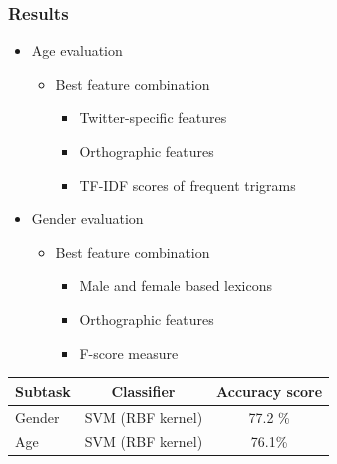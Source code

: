 \documentclass[slidestop,compress,11pt,xcolor=dvipsnames]{beamer}
\begin{document}
\begin{frame}[fragile] %
\frametitle{Results}
\begin{itemize}
	\item Age evaluation
	\begin{itemize}
		\item Best feature combination
		\begin{itemize}
			\item Twitter-specific features 
			\item Orthographic features
			\item TF-IDF scores of frequent trigrams
		\end{itemize}
	\end{itemize}
	\item Gender evaluation
	\begin{itemize}
		\item Best feature combination
		\begin{itemize}
			\item Male and female based lexicons
			\item Orthographic features
			\item F-score measure
		\end{itemize}
	\end{itemize}
\end{itemize}
\begin{table}[h]
\label{tab:narrow-table-3}
\begin{center}
\begin{tabular}{lcc}
\toprule
Subtask & Classifier & Accuracy score\\
\midrule
 Gender & SVM (RBF kernel) & 77.2 \% \\
 Age & SVM (RBF kernel) & 76.1\%\\
\bottomrule
\end{tabular}
\end{center}
\end{table}
\end{frame}


\end{document}
